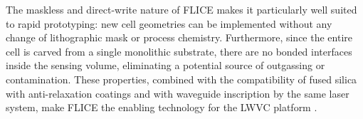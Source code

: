 The maskless and direct-write nature of FLICE makes it particularly well 
suited to rapid prototyping: new cell geometries can be implemented without 
any change of lithographic mask or process chemistry. Furthermore, since the 
entire cell is carved from a single monolithic substrate, there are no 
bonded interfaces inside the sensing volume, eliminating a potential source 
of outgassing or contamination. These properties, combined with the 
compatibility of fused silica with anti-relaxation coatings and with 
waveguide inscription by the same laser system, make FLICE the enabling 
technology for the LWVC platform \cite{lucivero2022, corrielli2021}.